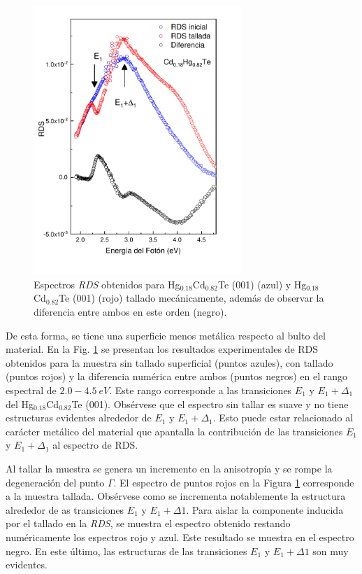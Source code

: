 \begin{figure}[H]
    \centering
    \includegraphics[width=0.7\textwidth]{figures/chap4/hgcdte-strained/rds-results/hgcdte_rds_comparision.pdf}
        \caption{Espectros \textit{RDS} obtenidos para Hg$_{0.18}$Cd$_{0.82}$Te (001) (azul) y 
        Hg$_{0.18}$Cd$_{0.82}$Te (001) (rojo) tallado mecánicamente, además de observar la diferencia entre ambos en este orden (negro).}
    \label{fig:hgcdte_rds_comparision}
\end{figure}

De esta forma, se tiene una superficie menos metálica respecto al bulto del material. En la Fig. 
\ref{fig:hgcdte_rds_comparision} se presentan los resultados experimentales de RDS obtenidos para la muestra sin tallado superficial (puntos azules), con tallado (puntos rojos) y la diferencia numérica entre ambos (puntos negros) en el rango espectral de $ 2.0-4.5\ eV $. 
Este rango corresponde a las transiciones $E_{1}$ y $E_{1}+\Delta_{1}$ del Hg$_{0.18}$Cd$_{0.82}$Te (001)\cite{Camacho2005}. Obsérvese que el espectro sin tallar es suave y no tiene estructuras evidentes alrededor de $E_{1}$ y $E_{1}+\Delta_{1}$. Esto puede estar relacionado al carácter metálico del material que apantalla la contribución de las transiciones $E_{1}$ y $E_{1}+\Delta_{1}$ al espectro de RDS. 

Al tallar la muestra se genera un incremento en la anisotropía y se rompe la degeneración del punto $\Gamma$. El espectro de puntos rojos en la Figura \ref{fig:hgcdte_rds_comparision} corresponde a la muestra tallada. Obsérvese como se incrementa notablemente la estructura alrededor de as transiciones $E_{1}$ y $E_{1}+\Delta1$. Para aislar la componente inducida por el tallado en la \textit{RDS}, se muestra el espectro obtenido restando numéricamente los espectros rojo y azul. Este resultado se muestra en el espectro negro. En este último, las estructuras de las transiciones $E_{1}$ y $E_{1}+\Delta1$ son muy evidentes.

